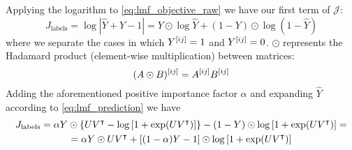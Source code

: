 \begin{apendicesenv}
Applying the logarithm to \autoref{eq:lmf_objective_raw} we have our first term of $\mathcal{J}$:
%
\begin{equation*}
    J_\text{labels} = \log |\hat Y + Y - 1| = Y \odot \log \hat Y + (1 - Y) \odot \log (1 - \hat Y)
\end{equation*}
%
where we separate the cases in which $Y^{[ij]} = 1$ and $Y^{[ij]} = 0$. $\odot$ represents the Hadamard product (element-wise multiplication) between matrices:
%
\begin{equation*}
    (A \odot B)^{[ij]} = A^{[ij]} B^{[ij]}
\end{equation*}
%
Adding the aforementioned positive importance factor $\alpha$ and expanding $\hat Y$ according to \autoref{eq:lmf_prediction} we have
%
%
\begin{multline}
    J_\text{labels} =
        \alpha Y \odot \left\{UV^\intercal - \log\left[1 + \exp(UV^\intercal)\right]\right\} 
        - (1 - Y) \odot \log \left[1 + \exp(UV^\intercal)\right]
    =\\
    =
        \alpha Y \odot UV^\intercal
        + [(1 - \alpha) Y - 1] \odot \log \left[1+\exp(UV^\intercal)\right]
\end{multline}


\end{apendicesenv}
